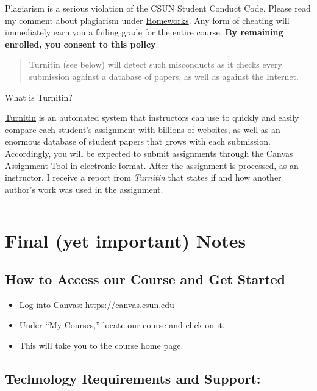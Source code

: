 \documentclass[11pt,]{article}
\providecommand{\tightlist}{%
  \setlength{\itemsep}{0pt}\setlength{\parskip}{0pt}}
\begin{document}
Plagiarism is a serious violation of the CSUN Student Conduct Code.
Please read my comment about plagiarism under
\protect\hyperlink{homeworks}{Homeworks}. Any form of cheating will
immediately earn you a failing grade for the entire course. \textbf{By
remaining enrolled, you consent to this policy}.

\begin{quote}
Turnitin (see below) will detect such misconducts as it checks every
submission against a database of papers, as well as against the
Internet.
\end{quote}

What is Turnitin?

\href{https://www.turnitin.com/}{Turnitin} is an automated system that
instructors can use to quickly and easily compare each student's
assignment with billions of websites, as well as an enormous database of
student papers that grows with each submission. Accordingly, you will be
expected to submit assignments through the Canvas Assignment Tool in
electronic format. After the assignment is processed, as an instructor,
I receive a report from \emph{Turnitin} that states if and how another
author's work was used in the assignment.

\begin{center}\rule{0.5\linewidth}{0.5pt}\end{center}

\hypertarget{final-yet-important-notes}{%
\section{Final (yet important) Notes}\label{final-yet-important-notes}}

\hypertarget{how-to-access-our-course-and-get-started}{%
\subsection{How to Access our Course and Get
Started}\label{how-to-access-our-course-and-get-started}}

\begin{itemize}
\tightlist
\item
  Log into Canvas: \url{https://canvas.csun.edu}
\item
  Under ``My Courses,'' locate our course and click on it.
\item
  This will take you to the course home page.
\end{itemize}

\hypertarget{technology-requirements-and-support}{%
\subsection{Technology Requirements and
Support:}\label{technology-requirements-and-support}}
\end{document}

